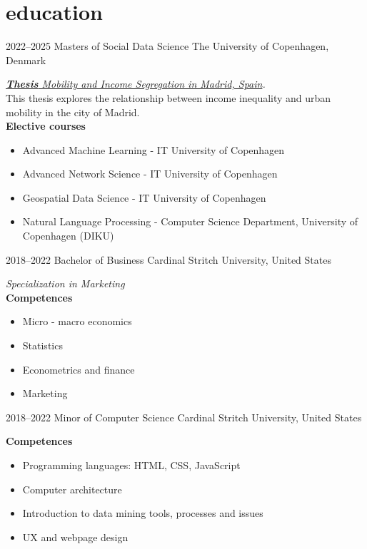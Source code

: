 \documentclass[]{friggeri-cv-a4}
\begin{document}

\section{education}

\begin{entrylist}


\entry
{2022--2025}
{Masters {\normalfont of Social Data Science}}
{The University of Copenhagen, Denmark}
{\emph{\href{https://github.com/carobs9/segregation-madrid}{\textbf{Thesis} Mobility and Income Segregation in Madrid, Spain}.} \\ 
This thesis explores the relationship between income inequality and urban mobility in the city of Madrid. \\
\textbf{Elective courses}
\begin{itemize}
    \item Advanced Machine Learning - IT University of Copenhagen
    \item Advanced Network Science - IT University of Copenhagen
    \item Geospatial Data Science - IT University of Copenhagen
    \item Natural Language Processing - Computer Science Department, University of Copenhagen (DIKU)
\end{itemize}}

\entry
{2018--2022}
{Bachelor {\normalfont of Business}}
{Cardinal Stritch University, United States}
{\emph{Specialization in Marketing} \\
\textbf{Competences}
\begin{itemize}
    \item Micro - macro economics
    \item Statistics
    \item Econometrics and finance
    \item Marketing
\end{itemize}}

\entry
{2018--2022}
{Minor {\normalfont of Computer Science}}
{Cardinal Stritch University, United States}
{\textbf{Competences}
\begin{itemize}
    \item Programming languages: HTML, CSS, JavaScript
    \item Computer architecture
    \item Introduction to data mining tools, processes and issues
    \item UX and webpage design
\end{itemize}}

\end{entrylist}
\end{document}
